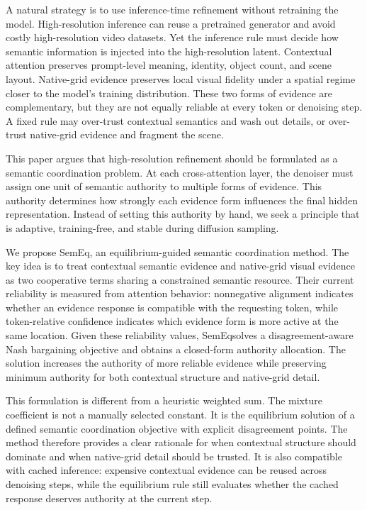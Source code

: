 \documentclass[10pt,twocolumn]{article}
\newcommand{\method}{SemEq}
\begin{document}
A natural strategy is to use inference-time refinement without retraining the model. High-resolution inference can reuse a pretrained generator and avoid costly high-resolution video datasets. Yet the inference rule must decide how semantic information is injected into the high-resolution latent. Contextual attention preserves prompt-level meaning, identity, object count, and scene layout. Native-grid evidence preserves local visual fidelity under a spatial regime closer to the model's training distribution. These two forms of evidence are complementary, but they are not equally reliable at every token or denoising step. A fixed rule may over-trust contextual semantics and wash out details, or over-trust native-grid evidence and fragment the scene.

This paper argues that high-resolution refinement should be formulated as a semantic coordination problem. At each cross-attention layer, the denoiser must assign one unit of semantic authority to multiple forms of evidence. This authority determines how strongly each evidence form influences the final hidden representation. Instead of setting this authority by hand, we seek a principle that is adaptive, training-free, and stable during diffusion sampling.

We propose \method, an equilibrium-guided semantic coordination method. The key idea is to treat contextual semantic evidence and native-grid visual evidence as two cooperative terms sharing a constrained semantic resource. Their current reliability is measured from attention behavior: nonnegative alignment indicates whether an evidence response is compatible with the requesting token, while token-relative confidence indicates which evidence form is more active at the same location. Given these reliability values, \method solves a disagreement-aware Nash bargaining objective and obtains a closed-form authority allocation. The solution increases the authority of more reliable evidence while preserving minimum authority for both contextual structure and native-grid detail.

This formulation is different from a heuristic weighted sum. The mixture coefficient is not a manually selected constant. It is the equilibrium solution of a defined semantic coordination objective with explicit disagreement points. The method therefore provides a clear rationale for when contextual structure should dominate and when native-grid detail should be trusted. It is also compatible with cached inference: expensive contextual evidence can be reused across denoising steps, while the equilibrium rule still evaluates whether the cached response deserves authority at the current step.
\end{document}
